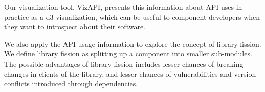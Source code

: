 Our visualization tool, VizAPI, presents this information about API uses in practice as a d3 visualization, which can be useful to component developers when they want to introspect about their software. 

We also apply the API usage information to explore the concept of library fission. We define library fission as splitting up a component into smaller sub-modules. The possible advantages of library fission includes lesser chances of breaking changes in clients of the library, and lesser chances of vulnerabilities and version conflicts introduced through dependencies.
